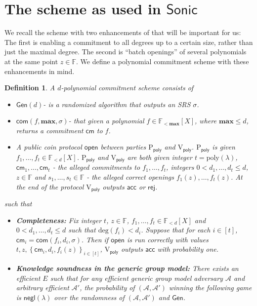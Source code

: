 \documentclass[11pt]{article}
\numberwithin{figure}{section} %
\newtheorem{dfn}[thm]{Definition}
\renewcommand{\max}{\ensuremath{\mathrm{\mathbf{max}}}\xspace}
\newcommand{\set}[1]{\ensuremath{\left\{#1\right\}}\xspace}
\newcommand{\poly}{\ensuremath{\mathrm{poly}(\lambda)}\xspace}
\newcommand{\F}{\ensuremath{\mathbb F}\xspace}
\newcommand{\adv}{\ensuremath{\mathcal A}\xspace}
\newcommand{\advprime}{\ensuremath{{\mathcal A}'}\xspace}
\renewcommand{\deg}{\ensuremath{\mathrm{deg}}\xspace}
\newcommand{\negl}{\ensuremath{\mathsf{negl}(\lambda)}\xspace}
\newcommand{\rej}{\ensuremath{\mathsf{rej}}\xspace}
\newcommand{\acc}{\ensuremath{\mathsf{acc}}\xspace}
\newcommand{\sett}[2]{\ensuremath{\set{#1}_{#2}}\xspace}
\newcommand{\gen}{\ensuremath{\mathsf{Gen}}\xspace}
\newcommand{\prvpoly}{\ensuremath{\mathrm{P_{\mathsf{poly}}}}\xspace}
\newcommand{\verpoly}{\ensuremath{\mathrm{V_{\mathsf{poly}}}}\xspace}
\newcommand{\sonic}{\ensuremath{\mathsf{Sonic}}\xspace}
\newcommand{\ext}{\ensuremath{E}\xspace}
\newcommand{\polysofdeg}[1]{\ensuremath{\F_{< #1}[X]}\xspace}
\begin{document}
\section{The \cite{kate} scheme as used in \sonic}\label{sec:kate}
We recall the \cite{kate} scheme with two enhancements of \cite{sonic} that will be important for us: The first is enabling a commitment to all degrees up to a certain size, rather than just the maximal degree. The second is ``batch openings'' of several polynomials at the same point $z\in \F$.
We define a polynomial commitment scheme with these enhancements in mind.
\newcommand{\srs}{\ensuremath{\sigma}\xspace}
\newcommand{\com}{\ensuremath{\mathsf{com}}\xspace}
\newcommand{\cm}{\ensuremath{\mathsf{cm}}\xspace}
\newcommand{\open}{\ensuremath{\mathsf{open}}\xspace}
\begin{dfn}\label{dfn:PCscheme}
A $d$-polynomial commitment scheme consists of 
\begin{itemize}
 \item $\gen(d)$- is a randomized algorithm that outputs an SRS \srs.
 \item $\com(f,\max,\srs)$- that given a polynomial $f\in \polysofdeg{\max}$, where $\max\leq d$, returns a commitment \cm to $f$.
 \item A public coin protocol  \open between parties \prvpoly and \verpoly. \prvpoly is given $ f_1,\ldots,f_t \in \polysofdeg{d}$. \prvpoly and \verpoly are both given integer $t=\poly$, $\cm_1,\ldots,\cm_t$ - the alleged commitments to $f_1,\ldots,f_t$, integers $0< d_1,\ldots,d_t \leq d$, $z\in\F$ and $s_1,\ldots,s_t\in \F$ - the alleged correct openings $f_1(z),\ldots,f_t(z)$. At the end of the protocol \verpoly outputs \acc or \rej. 
\end{itemize}
such that
\begin{itemize}
 \item \textbf{Completeness:} Fix integer $t$, $z\in \F$, $f_1,\ldots,f_t \in \polysofdeg{d}$ and $0< d_1,\ldots,d_t\leq d$
 such that $\deg(f_i)<d_i$.
 Suppose that for each $i\in [t]$, $\cm_i = \com(f_i,d_i,\srs)$.  Then if \open is run correctly with values
 $t,z, \sett{\cm_i,d_i,f_i(z)}{i\in [t]}$, \verpoly outputs \acc with probability one.
 \item \textbf{Knowledge soundness in the generic group model:} There exists an efficient \ext such that for any efficient generic group model adversary \adv and arbitrary efficient \advprime, the probability of $(\adv,\advprime)$ winning the following game is \negl over the randomness of $(\adv,\advprime)$ and \gen.

\end{itemize}
\end{dfn}
\end{document}
